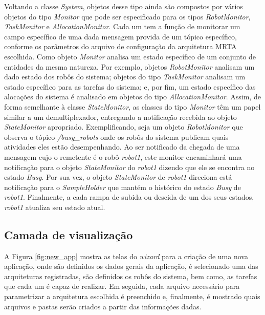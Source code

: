             Voltando a classe \textit{System}, objetos desse tipo ainda são compostos por vários objetos do tipo \textit{Monitor} que pode ser especificado para os tipos \textit{RobotMonitor}, \textit{TaskMonitor} e \textit{AllocationMonitor}. Cada um tem a função de monitorar um campo específico de uma dada mensagem provida de um tópico específico, conforme os parâmetros do arquivo de configuração da arquitetura MRTA escolhida.  Como objeto \textit{Monitor} analisa um estado específico de um conjunto de entidades da mesma natureza. Por exemplo, objetos \textit{RobotMonitor} analisam um dado estado dos robôs do sistema; objetos do tipo \textit{TaskMonitor} analisam um estado específico para as tarefas do sistema; e, por fim, um estado específico das alocações do sistema é analisado em objetos do tipo \textit{AllocationMonitor}. Assim, de forma semelhante à classe \textit{StateMonitor}, as classes do tipo \textit{Monitor} têm um papel similar a um demultiplexador, entregando a notificação recebida ao objeto \textit{StateMonitor} apropriado. Exemplificando, seja um objeto \textit{RobotMonitor} que observa o tópico \textit{/busy\_robots} onde os robôs do sistema publicam quais atividades eles estão desempenhando. Ao ser notificado da chegada de uma mensagem cujo o remetente é o robô \textit{robot1}, este monitor encaminhará uma notificação para o objeto \textit{StateMonitor} do \textit{robot1} dizendo que ele se encontra no estado \textit{Busy}. Por sua vez, o objeto \textit{StateMonitor} de \textit{robot1} direciona está notificação para o \textit{SampleHolder} que mantém o histórico do estado \textit{Busy} de \textit{robot1}. Finalmente, a cada rampa de subida ou descida de um dos seus estados, \textit{robot1} atualiza seu estado atual.
            
        \subsection{Camada de visualização} \label{subsec:rqt_mrta_view}
            A Figura \ref{fig:new_app} mostra as telas do \textit{wizard} para a criação de uma nova aplicação, onde são definidos os dados gerais da aplicação, é selecionado uma das arquiteturas registradas, são definidos os robôs do sistema, bem como, as tarefas que cada um é capaz de realizar. Em seguida, cada arquivo necessário para parametrizar a arquitetura escolhida é preenchido e, finalmente, é mostrado quais arquivos e pastas serão criados a partir das informações dadas.
            
